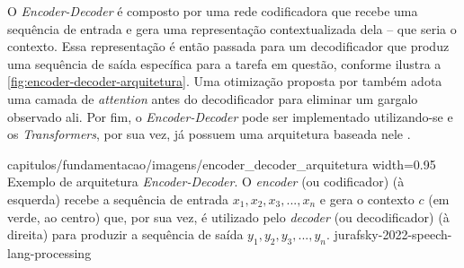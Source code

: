 O \textit{Encoder-Decoder} é composto por uma rede codificadora que recebe uma sequência de entrada e gera uma representação contextualizada dela -- que seria o contexto. Essa representação é então passada para um decodificador que produz uma sequência de saída específica para a tarefa em questão, conforme ilustra a \autoref{fig:encoder-decoder-arquitetura}. Uma otimização proposta por  também adota uma camada de \textit{attention} antes do decodificador para eliminar um gargalo observado ali.
Por fim, o \textit{Encoder-Decoder} pode ser implementado utilizando-se  e os \textit{Transformers}, por sua vez, já possuem uma arquitetura baseada nele \cite{jurafsky-2022-speech-lang-processing}. 

    {capitulos/fundamentacao/imagens/encoder_decoder_arquitetura}
    {width=0.95\textwidth}
    {Exemplo de arquitetura \textit{Encoder-Decoder}. O \textit{encoder} (ou codificador) (à esquerda) recebe a sequência de entrada \(x_1, x_2, x_3, ..., x_n\) e gera o contexto \(c\) (em verde, ao centro) que, por sua vez, é utilizado pelo \textit{decoder} (ou decodificador) (à direita) para produzir a sequência de saída \(y_1, y_2, y_3, ..., y_n\).}
    {jurafsky-2022-speech-lang-processing}





